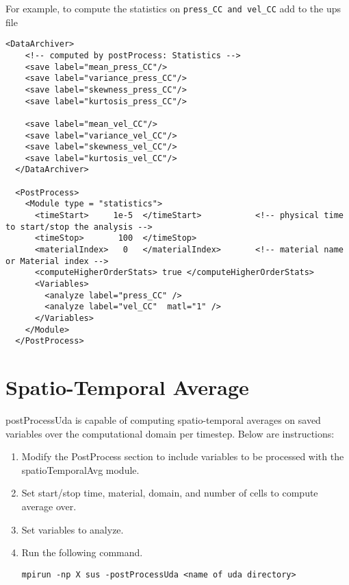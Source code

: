 For example, to compute the statistics on \verb|press_CC and vel_CC| add to the ups file

\begin{Verbatim}[fontsize=\footnotesize]
  <DataArchiver>
    <!-- computed by postProcess: Statistics -->
    <save label="mean_press_CC"/>
    <save label="variance_press_CC"/>
    <save label="skewness_press_CC"/>
    <save label="kurtosis_press_CC"/>
    
    <save label="mean_vel_CC"/>
    <save label="variance_vel_CC"/>
    <save label="skewness_vel_CC"/>
    <save label="kurtosis_vel_CC"/>
  </DataArchiver>

  <PostProcess>
    <Module type = "statistics">
      <timeStart>     1e-5  </timeStart>           <!-- physical time to start/stop the analysis -->
      <timeStop>       100  </timeStop>
      <materialIndex>   0   </materialIndex>       <!-- material name or Material index -->
      <computeHigherOrderStats> true </computeHigherOrderStats>
      <Variables>
        <analyze label="press_CC" />
        <analyze label="vel_CC"  matl="1" />
      </Variables>
    </Module>
  </PostProcess>
\end{Verbatim}


\section{Spatio-Temporal Average}
postProcessUda is capable of computing spatio-temporal averages on saved variables over the computational domain per timestep. Below are instructions:

\begin{enumerate}
  \item Modify the PostProcess section to include variables to be processed with the spatioTemporalAvg module. 
  \item Set start/stop time, material, domain, and number of cells to compute average over.
  \item Set variables to analyze.
  \item Run the following command.
    \begin{Verbatim}[fontsize=\footnotesize]
      mpirun -np X sus -postProcessUda <name of uda directory>
    \end{Verbatim}
\end{enumerate}


